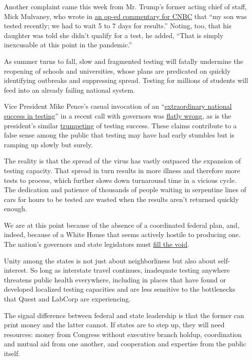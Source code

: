 Another complaint came this week from Mr. Trump's former acting chief of
staff, Mick Mulvaney, who wrote in
\href{https://www.cnbc.com/2020/07/13/mick-mulvaney-next-stimulus-bill-should-deal-with-covid-19.html}{an
op-ed commentary for CNBC} that ``my son was tested recently; we had to
wait 5 to 7 days for results.'' Noting, too, that his daughter was told
she didn't qualify for a test, he added, ``That is simply inexcusable at
this point in the pandemic.''

As summer turns to fall, slow and fragmented testing will fatally
undermine the reopening of schools and universities, whose plans are
predicated on quickly identifying outbreaks and suppressing spread.
Testing for millions of students will feed into an already failing
national system.

Vice President Mike Pence's casual invocation of an
``\href{https://thehill.com/homenews/administration/503899-pence-in-call-with-governors-defends-trump-comments-on-coronavirus}{extraordinary
national success in testing}'' in a recent call with governors was
\href{http://perma.cc/3F3D-NS6W}{flatly wrong}, as is the president's
similar
\href{https://twitter.com/realDonaldTrump/status/1280205902742781958?s=20}{trumpeting}
of testing success. These claims contribute to a false sense among the
public that testing may have had early stumbles but is ramping up slowly
but surely.

The reality is that the spread of the virus has vastly outpaced the
expansion of testing capacity. That spread in turn results in more
illness and therefore more tests to process, which further slows down
turnaround time in a vicious cycle. The dedication and patience of
thousands of people waiting in serpentine lines of cars for hours to be
tested are wasted when the results aren't returned quickly enough.

We are at this point because of the absence of a coordinated federal
plan, and, indeed, because of a White House that seems actively hostile
to producing one. The nation's governors and state legislators must
\href{https://perma.cc/TY79-GWLG}{fill the void}.

Unity among the states is not just about neighborliness but also about
self-interest. So long as interstate travel continues, inadequate
testing anywhere threatens public health everywhere, including in places
that have found or developed localized testing capacities and are less
sensitive to the bottlenecks that Quest and LabCorp are experiencing.

The signal difference between federal and state leadership is that the
former can print money and the latter cannot. If states are to step up,
they will need resources: money from Congress without executive branch
holdup, coordination and mutual aid from one another, and cooperation
and expertise from the public itself.

